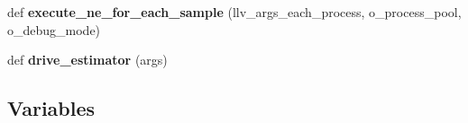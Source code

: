 \begin{DoxyCompactItemize}
\item 
def {\bfseries execute\+\_\+ne\+\_\+for\+\_\+each\+\_\+sample} (llv\+\_\+args\+\_\+each\+\_\+process, o\+\_\+process\+\_\+pool, o\+\_\+debug\+\_\+mode)\hypertarget{namespacenegui_1_1pgdriveneestimator_af354d19f51ec17508f02c50817d4d94d}{}\label{namespacenegui_1_1pgdriveneestimator_af354d19f51ec17508f02c50817d4d94d}

\item 
def {\bfseries drive\+\_\+estimator} (args)\hypertarget{namespacenegui_1_1pgdriveneestimator_a688d7a2f0a11f0225a5f95d7403d771e}{}\label{namespacenegui_1_1pgdriveneestimator_a688d7a2f0a11f0225a5f95d7403d771e}

\end{DoxyCompactItemize}
\subsection*{Variables}
